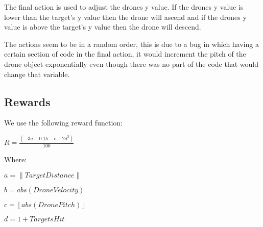 The final action is used to adjust the drones y value. If the drones y value is lower than the target's y value then the drone will ascend and if the drones y value is above the target's y value then the drone will descend. 

The actions seem to be in a random order, this is due to a bug in which having a certain section of code in the final action, it would increment the pitch of the drone object exponentially even though there was no part of the code that would change that variable.

\subsection{Rewards}
We use the following reward function:


$R=\frac{(-3a+0.1b-c+2d^3)}{100}$

Where:

$a=\left \| Target Distance \right \|$

$b=abs(Drone Velocity)$

$c= \left \lfloor abs(DronePitch)  \right \rfloor $

$d=1+TargetsHit$


